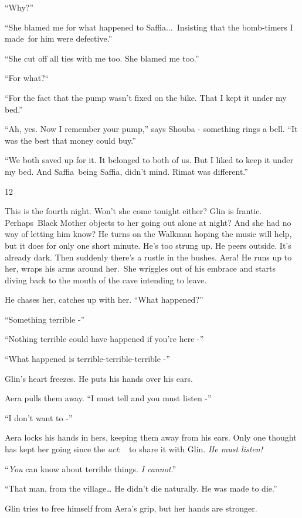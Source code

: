 \documentclass[twoside,11pt]{book}
\begin{document}
``Why?'' 

``She blamed me for what happened to Saffia...\ Insisting that the bomb-timers I made\ for him were
defective.'' 

``She cut off all ties with me too. She blamed me too.'' 

``For what?``~ 

``For the fact that the pump wasn't fixed on the bike. That I kept it under my bed.'' 

``Ah, yes. Now I remember your pump,'' says Shouba - something rings a bell. ``It was the best that money
could buy.''

{}``We both saved up for it. It belonged to both of us. But I liked to keep it under my bed. And Saffia~being Saffia,
didn't mind. Rimat was different.'' 


\bigskip

12~

This is the fourth night. Won't she come tonight either? Glin is frantic. Perhaps~Black Mother objects to her going out
alone at night? And she had no way of letting him know? He turns on the Walkman hoping the music will help, but it does
for only one short minute. He's too strung up. He peers outside. It's already dark. Then suddenly there's a rustle in
the bushes. Aera! He runs up to her, wraps his arms around her.\ She wriggles out of his embrace and starts diving back
to the mouth of the cave intending to leave.

 He chases her, catches up with her. ``What happened?'' 

``Something terrible -'' 

``Nothing terrible could have happened if you're here -'' 

``What happened is terrible-terrible-terrible -'' 

Glin's heart freezes. He puts his hands over his ears. 

Aera pulls them away. ``I must tell and you must listen -'' 

``I don't want to -'' 

Aera locks his hands in hers, keeping them away from his ears. Only one thought has kept her going since the
\textit{act}:\ \ to share it with Glin. \textit{He must listen! }

``\textit{You} can know about terrible things. \textit{I cannot}.'' \ 

``That man, from the village{\dots} He didn't die naturally. He was made to die.'' 

Glin tries to free himself from Aera's grip, but her hands are stronger. 
\end{document}
